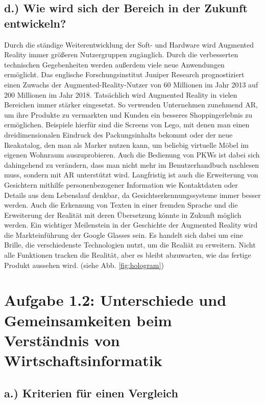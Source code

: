 \documentclass[12pt,utf8]{scrartcl}
\begin{document}
\begin{flushleft}
\subsection*{\label{sub4:thema}d.) Wie wird sich der Bereich in der Zukunft entwickeln?}

Durch die ständige Weiterentwicklung der Soft- und Hardware wird Augmented Reality immer größeren Nutzergruppen zugänglich. Durch die verbesserten technischen Gegebenheiten werden außerdem viele neue Anwendungen ermöglicht. Das englische Forschungsinstitut Juniper Research prognostiziert einen Zuwachs der Augmented-Reality-Nutzer von 60 Millionen im Jahr 2013 auf 200 Millionen im Jahr 2018. Tatsächlich wird Augmented Reality in vielen Bereichen immer stärker eingesetzt. So verwenden Unternehmen zunehmend AR, um ihre Produkte zu vermarkten und Kunden ein besseres Shoppingerlebnis zu ermöglichen. Beispiele hierfür sind die Screens von Lego, mit denen man einen dreidimensionalen Eindruck des Packungsinhalts bekommt oder der neue Ikeakatalog, den man als Marker nutzen kann, um beliebig virtuelle Möbel im eigenen Wohnraum auszuprobieren. Auch die Bedienung von PKWs ist dabei sich dahingehend zu verändern, dass man nicht mehr im Benutzerhandbuch nachlesen muss, sondern mit AR unterstützt wird. Langfristig ist auch die Erweiterung von Gesichtern mithilfe personenbezogener Information wie Kontaktdaten oder Details aus dem Lebenslauf denkbar, da Gesichtserkennungssysteme immer besser werden. Auch die Erkennung von Texten in einer fremden Sprache und die Erweiterung der Realität mit deren Übersetzung könnte in Zukunft möglich werden. Ein wichtiger Meilenstein in der Geschichte der Augmented Reality wird die Markteinführung der Google Glasses sein. Es handelt sich dabei um eine Brille, die verschiedenste Technologien nutzt, um die Realiät zu erweitern. Nicht alle Funktionen tracken die Realität, aber es bleibt abzuwarten, wie das fertige Produkt aussehen wird. (siehe Abb. \ref{fig:hologram})

\newpage
\section*{\label{sec:einfuehrung}Aufgabe 1.2: Unterschiede und Gemeinsamkeiten beim Verständnis von Wirtschaftsinformatik}
\subsection*{\label{sub:einfuehrung}a.) Kriterien für einen Vergleich}


\end{flushleft}
\end{document}
